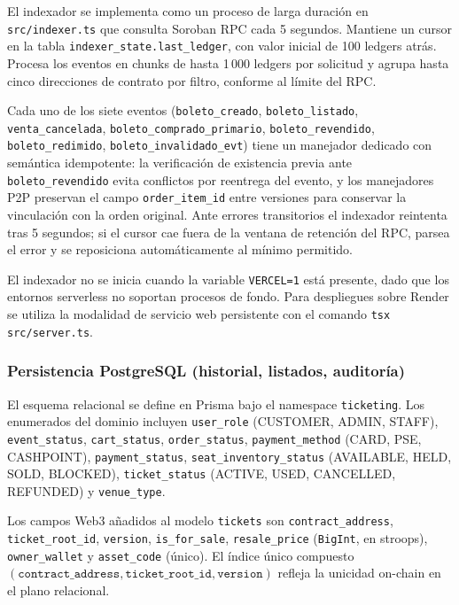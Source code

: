 El indexador se implementa como un proceso de larga duración en \texttt{src/indexer.ts} que consulta Soroban RPC cada 5 segundos. Mantiene un cursor en la tabla \texttt{indexer\_state.last\_ledger}, con valor inicial de 100 ledgers atrás. Procesa los eventos en chunks de hasta 1\,000 ledgers por solicitud y agrupa hasta cinco direcciones de contrato por filtro, conforme al límite del RPC.

Cada uno de los siete eventos (\texttt{boleto\_creado}, \texttt{boleto\_listado}, \texttt{venta\_cancelada}, \texttt{boleto\_comprado\_primario}, \texttt{boleto\_revendido}, \texttt{boleto\_redimido}, \texttt{boleto\_invalidado\_evt}) tiene un manejador dedicado con semántica idempotente: la verificación de existencia previa ante \texttt{boleto\_revendido} evita conflictos por reentrega del evento, y los manejadores P2P preservan el campo \texttt{order\_item\_id} entre versiones para conservar la vinculación con la orden original. Ante errores transitorios el indexador reintenta tras 5 segundos; si el cursor cae fuera de la ventana de retención del RPC, parsea el error y se reposiciona automáticamente al mínimo permitido.

El indexador no se inicia cuando la variable \texttt{VERCEL=1} está presente, dado que los entornos serverless no soportan procesos de fondo. Para despliegues sobre Render se utiliza la modalidad de servicio web persistente con el comando \texttt{tsx src/server.ts}.

\subsubsection{Persistencia PostgreSQL (historial, listados, auditoría)}

El esquema relacional se define en Prisma bajo el namespace \texttt{ticketing}. Los enumerados del dominio incluyen \texttt{user\_role} (CUSTOMER, ADMIN, STAFF), \texttt{event\_status}, \texttt{cart\_status}, \texttt{order\_status}, \texttt{payment\_method} (CARD, PSE, CASHPOINT), \texttt{payment\_status}, \texttt{seat\_inventory\_status} (AVAILABLE, HELD, SOLD, BLOCKED), \texttt{ticket\_status} (ACTIVE, USED, CANCELLED, REFUNDED) y \texttt{venue\_type}.

Los campos Web3 añadidos al modelo \texttt{tickets} son \texttt{contract\_address}, \texttt{ticket\_root\_id}, \texttt{version}, \texttt{is\_for\_sale}, \texttt{resale\_price} (\texttt{BigInt}, en stroops), \texttt{owner\_wallet} y \texttt{asset\_code} (único). El índice único compuesto \((\texttt{contract\_address}, \texttt{ticket\_root\_id}, \texttt{version})\) refleja la unicidad on-chain en el plano relacional.

